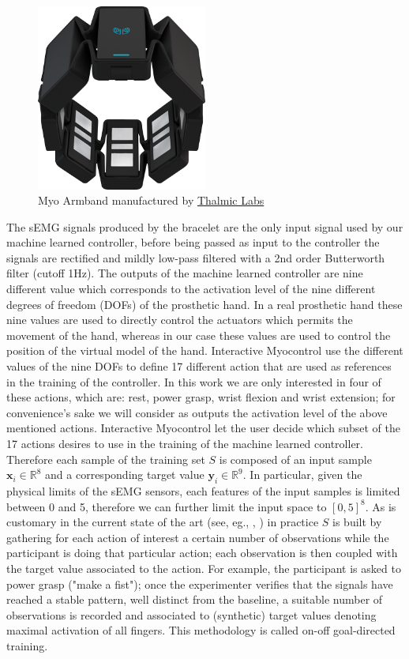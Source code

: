 \begin{figure}[ht]
    \centering
    \includegraphics[width=0.5\textwidth]{Images/myo_armband.png}
    \caption{Myo Armband manufactured by \href{https://www.myo.com/techspecs}{Thalmic Labs}}
    \label{fig:myo_armband}
\end{figure}
The sEMG signals produced by the bracelet are the only input signal used by our machine learned controller, before being passed as input to the controller the signals are rectified and mildly low-pass filtered with a 2nd order Butterworth filter (cutoff 1Hz).
The outputs of the machine learned controller are nine different value which corresponds to the activation level of the nine different degrees of freedom (DOFs) of the prosthetic hand. In a real prosthetic hand these nine values are used to directly control the actuators which permits the movement of the hand, whereas in our case these values are used to control the position of the virtual model of the hand. Interactive Myocontrol use the different values of the nine DOFs to define 17 different action that are used as references in the training of the controller. In this work we are only interested in four of these actions, which are: rest, power grasp, wrist flexion and wrist extension; for convenience's sake we will consider as outputs the activation level of the above mentioned actions.
Interactive Myocontrol let the user decide which subset of the 17 actions desires to use in the training of the machine learned controller.
Therefore each sample of the training set $S$ is composed of an input sample $\mathbf{x}_i \in \mathbb{R}^8$ and a corresponding target value $\mathbf{y}_i \in \mathbb{R}^9$. In particular, given the physical limits of the sEMG sensors, each features of the input samples is limited between 0 and 5, therefore we can further limit the input space to $[0, 5]^8$.
As is customary in the current state of the art (see, eg., \cite{hahne2015concurrent}, \cite{sierra2013realistic}) in practice $S$ is built by gathering for each action of interest a certain number of observations while the participant is doing that particular action; each observation is then coupled with the target value associated to the action.
For example, the participant is asked to power grasp ("make a fist"); once the experimenter verifies that the signals have reached a stable pattern, well distinct from the baseline, a suitable number of observations is recorded and associated to (synthetic) target values denoting maximal activation of all fingers. This methodology is called on-off goal-directed training.

